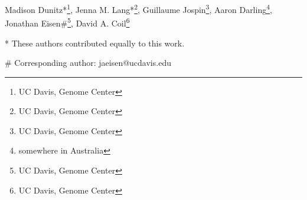 Madison Dunitz*\footnote{UC Davis, Genome Center}, Jenna M. Lang*\footnote{UC Davis, Genome Center}, Guillaume Jospin\footnote{UC Davis, Genome Center}, Aaron Darling\footnote{somewhere in Australia}, Jonathan Eisen\#\footnote{UC Davis, Genome Center}, David A. Coil\footnote{UC Davis, Genome Center} 

* These authors contributed equally to this work.

\# Corresponding author: jaeisen@ucdavis.edu